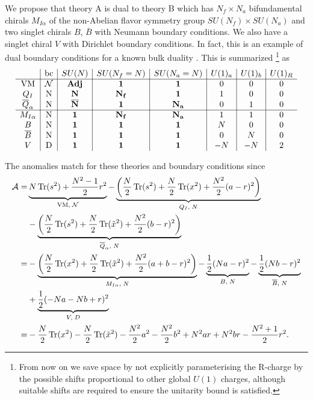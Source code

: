 \documentclass[12pt]{article}
\newcommand{\Acal}{\mathcal{A}}
\newcommand{\Ncal}{\mathcal{N}}
\DeclareMathOperator*{\Tr}{{\rm Tr}}
\numberwithin{equation}{section}
\begin{document}
We propose that 
theory A is dual to theory B which has $N_f \times N_a$ bifundamental chirals $M_{I \alpha}$ of the non-Abelian flavor symmetry group $SU(N_f) \times SU(N_a)$ and
two singlet chirals $B$, $\overline{B}$ with Neumann boundary conditions. 
We also have a singlet chiral $V$ with Dirichlet boundary conditions. 
In fact, this is an example of dual boundary conditions for a known bulk duality \cite{Aharony:1997bx}. 
This is summarized
\footnote{From now on we save space by not explicitly parameterising the R-charge by the possible shifts proportional to other global $U(1)$ charges, although suitable shifts are required to ensure the unitarity bound is satisfied.}
as
\begin{align}
\label{SUN_N_charges}
\begin{array}{c|c|c|c|c|c|c|c}
& \textrm{bc} & SU(N) & SU(N_f = N) & SU(N_a = N) & U(1)_a & U(1)_b & U(1)_R \\ \hline
\textrm{VM} & \mathcal{N} & {\bf Adj} & {\bf 1} & {\bf 1} & 0 & 0 & 0 \\
Q_I & \textrm{N} & {\bf N} & {\bf N_f} & {\bf 1} & 1 & 0 & 0 \\
\overline{Q}_{\alpha} & \textrm{N} & {\bf \overline{N}} & {\bf 1} & {\bf N_a} & 0 & 1 & 0 \\
 \hline
M_{I \alpha} & \textrm{N} & {\bf 1} & {\bf N_f} & {\bf N_a} & 1 & 1 & 0 \\
B & \textrm{N} & {\bf 1} & {\bf 1} & {\bf 1} & N & 0 & 0 \\
\overline{B} & \textrm{N} & {\bf 1} & {\bf 1} & {\bf 1} & 0 & N & 0 \\
V & \textrm{D} & {\bf 1} & {\bf 1} & {\bf 1} & -N & -N & 2
\end{array}
\end{align}

The anomalies match for these theories and boundary conditions since
\begin{align}
\label{bdy_AN_su1}
\Acal = & \underbrace{N\Tr(s^2) + \frac{N^2 - 1}{2}r^2}_{\textrm{VM}, \; \Ncal}
 - \underbrace{\left( \frac{N}{2} \Tr(s^2) + \frac{N}{2} \Tr(x^2) + \frac{N^2}{2}(a-r)^2 \right)}_{Q_I, \; N}
 \nonumber \\
 & - \underbrace{\left( \frac{N}{2} \Tr(s^2) + \frac{N}{2} \Tr(\tilde{x}^2) + \frac{N^2}{2}(b-r)^2 \right)}_{\overline{Q}_{\alpha}, \; N}
  \nonumber \\
  = & - \underbrace{\left( \frac{N}{2} \Tr(x^2) + \frac{N}{2} \Tr(\tilde{x}^2) + \frac{N^2}{2}(a+b-r)^2 \right)}_{M_{I \alpha}, \; N}
   - \underbrace{\frac{1}{2}(Na-r)^2}_{B, \; N}
   - \underbrace{\frac{1}{2}(Nb-r)^2}_{\overline{B}, \; N}
   \nonumber \\
 &  + \underbrace{\frac{1}{2}(-Na-Nb+r)^2}_{V, \; D}
  \nonumber \\
  = & - \frac{N}{2} \Tr(x^2) - \frac{N}{2} \Tr(\tilde{x}^2) - \frac{N^2}{2}a^2 - \frac{N^2}{2}b^2 + N^2 ar + N^2 br - \frac{N^2 + 1}{2}r^2. 
\end{align}
\end{document}
